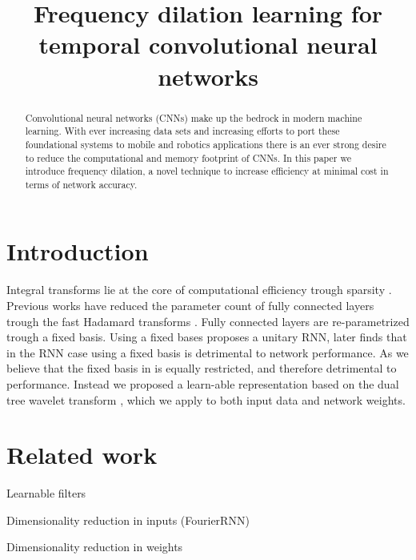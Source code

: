 \documentclass{article}
\title{Frequency dilation learning for temporal convolutional neural networks}
\begin{document}
\maketitle

\begin{abstract}
Convolutional neural networks (CNNs) make up the bedrock in modern machine learning. With ever increasing data sets and increasing efforts to port these foundational systems to mobile and robotics applications there is an ever strong desire to reduce the computational and memory footprint of CNNs. In this paper we introduce frequency dilation, a novel technique to increase efficiency at minimal cost in terms of network accuracy.
\end{abstract}

\section{Introduction}
Integral transforms lie at the core of computational efficiency trough sparsity \cite{Mallat}\cite{Strang1997}. Previous works have reduced the parameter count of fully connected layers trough the fast Hadamard transforms \cite{yang2015deep}. Fully connected layers are re-parametrized trough a fixed basis. Using a fixed bases \cite{Arjovsky2016} proposes a unitary RNN, later \cite{Wisdom2016} finds that in the RNN case using a fixed basis is detrimental to network performance. 
As we believe that the fixed basis in \cite{yang2015deep} is equally restricted, and therefore detrimental to performance. Instead we proposed a learn-able representation based on the dual tree wavelet transform \cite{Selesnick2005}, which we apply to both input data and network weights. 

\section{Related work}
Learnable filters \cite{Recoskie2018}

Dimensionality reduction in inputs (FourierRNN)

Dimensionality reduction in weights \cite{yang2015deep}
\end{document}

